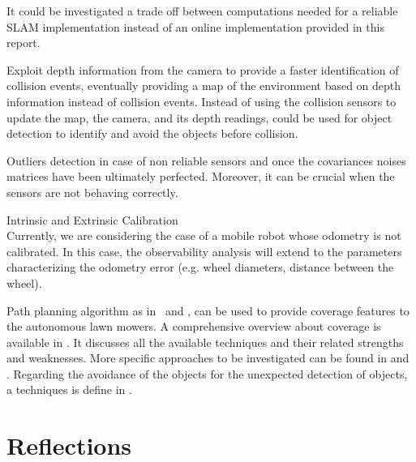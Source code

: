 It could be investigated a trade off between computations needed for a reliable SLAM implementation instead of an online implementation provided in this report.


Exploit depth information from the camera to provide a faster identification of collision events, eventually providing a map of the environment based on depth information instead of collision events.
Instead of using the collision sensors to update the map, the camera, and its depth readings,  could be used for object detection to identify and avoid the objects before collision.


Outliers detection in case of non reliable sensors and once the covariances noises matrices have been ultimately perfected. Moreover, it can be crucial when the sensors are not behaving correctly.


Intrinsic and Extrinsic Calibration\\
Currently, we are considering the case of a mobile
robot whose odometry is not calibrated. In this case,
the observability analysis will extend to the parameters
characterizing the odometry error (e.g. wheel diameters,
distance between the wheel).


Path planning algorithm as in~\cite{coveragePathplanning} and \cite{machines6040046}, can be used to provide coverage features to the autonomous lawn mowers.
A comprehensive overview about coverage is available in \cite{galceran_survey_2013}. It discusses all the available techniques and their related strengths and weaknesses.
More specific approaches to be investigated can be found in \cite{hameed_coverage_2017} and \cite{cabreira_grid-based_2019}.
Regarding the avoidance of the objects for the unexpected detection of objects, a techniques is define in \cite{daltorio_obstacle-edging_2010}.



\section{Reflections}
\label{sec:reflections}

